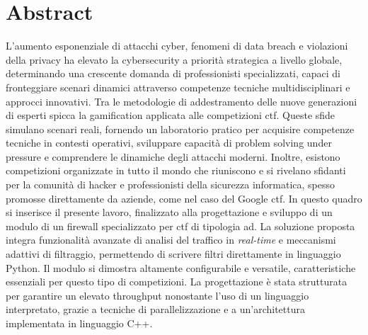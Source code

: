\chapter*{Abstract}

L'aumento esponenziale di attacchi cyber, fenomeni di data breach e violazioni della privacy ha elevato la cybersecurity a priorità strategica a livello globale, determinando una crescente domanda di professionisti specializzati, capaci di fronteggiare scenari dinamici attraverso competenze tecniche multidisciplinari e approcci innovativi.
Tra le metodologie di addestramento delle nuove generazioni di esperti spicca la gamification applicata alle competizioni \gls{ctf}. Queste sfide simulano scenari reali, fornendo un laboratorio pratico per acquisire competenze tecniche in contesti operativi, sviluppare capacità di problem solving under pressure e comprendere le dinamiche degli attacchi moderni.
Inoltre, esistono competizioni organizzate in tutto il mondo che riuniscono e si rivelano sfidanti per la comunità di hacker e professionisti della sicurezza informatica, spesso promosse direttamente da aziende, come nel caso del Google \gls{ctf}.
In questo quadro si inserisce il presente lavoro, finalizzato alla progettazione e sviluppo di un modulo di un firewall specializzato per \gls{ctf} di tipologia \gls{ad}. La soluzione proposta integra funzionalità avanzate di analisi del traffico in \textit{real-time} e meccanismi adattivi di filtraggio, permettendo di scrivere filtri direttamente in linguaggio Python.
Il modulo si dimostra altamente configurabile e versatile, caratteristiche essenziali per questo tipo di competizioni. La progettazione è stata strutturata per garantire un elevato throughput nonostante l’uso di un linguaggio interpretato, grazie a tecniche di parallelizzazione e a un’architettura implementata in linguaggio C++.
